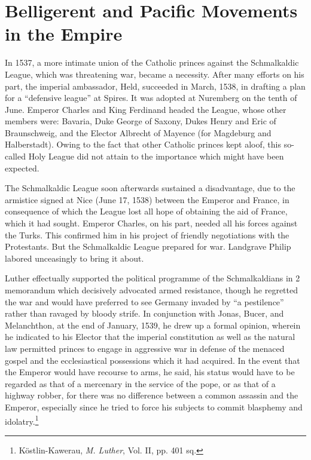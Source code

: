 \section{Belligerent and Pacific Movements in the Empire}

In 1537, a more intimate union of the Catholic princes against the
Schmalkaldic League, which was threatening war, became a necessity.
After many efforts on his part, the imperial ambassador, Held,
succeeded in March, 1538, in drafting a plan for a “defensive league”
at Spires. It was adopted at Nuremberg on the tenth of June. Emperor
Charles and King Ferdinand headed the League, whose other
members were: Bavaria, Duke George of Saxony, Dukes Henry and
Eric of Braunschweig, and the Elector Albrecht of Mayence (for
Magdeburg and Halberstadt). Owing to the fact that other Catholic
princes kept aloof, this so-called Holy League did not attain to the
importance which might have been expected.

The Schmalkaldic League soon afterwards sustained a disadvantage,
due to the armistice signed at Nice (June 17, 1538) between the
Emperor and France, in consequence of which the League lost all
hope of obtaining the aid of France, which it had sought. Emperor
Charles, on his part, needed all his forces against the Turks. This confirmed
him in his project of friendly negotiations with the Protestants.
But the Schmalkaldic League prepared for war. Landgrave Philip
labored unceasingly to bring it about.

Luther effectually supported the political programme of the
Schmalkaldians in 2 memorandum which decisively advocated armed
resistance, though he regretted the war and would have preferred to
see Germany invaded by “a pestilence” rather than ravaged by bloody
strife. In conjunction with Jonas, Bucer, and Melanchthon, at the end
of January, 1539, he drew up a formal opinion, wherein he indicated
to his Elector that the imperial constitution as well as the natural
law permitted princes to engage in aggressive war in defense of the
menaced gospel and the ecclesiastical possessions which it had acquired.
In the event that the Emperor would have recourse to arms,
he said, his status would have to be regarded as that of a mercenary
in the service of the pope, or as that of a highway robber, for there
was no difference between a common assassin and the Emperor, especially
since he tried to force his subjects to commit blasphemy and
idolatry.\footnote{Köstlin-Kawerau, \textit{M. Luther}, Vol. II, pp. 401 sq.}

